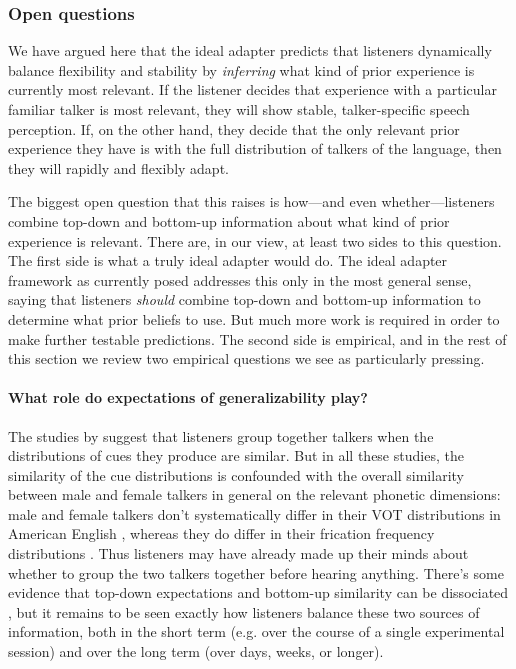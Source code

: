 \subsubsection{Open questions}
\label{sec:open-questions-infer-cluster}
\label{r1-cluster-questions}

We have argued here that the ideal adapter predicts that listeners dynamically balance flexibility and stability by \emph{inferring} what kind of prior experience is currently most relevant.  If the listener decides that experience with a particular familiar talker is most relevant, they will show stable, talker-specific speech perception.  If, on the other hand, they decide that the only relevant prior experience they have is with the full distribution of talkers of the language, then they will rapidly and flexibly adapt.  

The biggest open question that this raises is how---and even whether---listeners combine top-down and bottom-up information about what kind of prior experience is relevant.  There are, in our view, at least two sides to this question.  The first side is what a truly ideal adapter would do.  The ideal adapter framework as currently posed addresses this only in the most general sense, saying that listeners \emph{should} combine top-down and bottom-up information to determine what prior beliefs to use.  But much more work is required in order to make further testable predictions.  The second side is empirical, and in the rest of this section we review two empirical questions we see as particularly pressing.

\paragraph{What role do expectations of generalizability play?}
\label{sec:what-role-expect}

The studies by \textcite{Kraljic2005,Kraljic2006,Kraljic2007} suggest that listeners group together talkers when the distributions of cues they produce are similar.  But in all these studies, the similarity of the cue distributions is confounded with the overall similarity between male and female talkers in general on the relevant phonetic dimensions: male and female talkers don't systematically differ in their VOT distributions in American English \autocite{Allen2003}, whereas they do differ in their frication frequency distributions \autocite{Newman2001}.  Thus listeners may have already made up their minds about whether to group the two talkers together before hearing anything.  There's some evidence that top-down expectations and bottom-up similarity can be dissociated \autocite{Munson2011,Reinisch2014}, but it remains to be seen exactly how listeners balance these two sources of information, both in the short term (e.g. over the course of a single experimental session) and over the long term (over days, weeks, or longer).
\label{r1-reinisch2}

